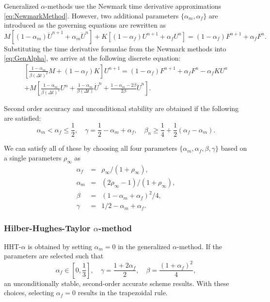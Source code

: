 \documentclass[12pt]{article}
\begin{document}
Generalized $\alpha$-methods \cite{Chung1993} use the Newmark time derivative approximations \eqref{eq:NewmarkMethod}.
However, two additional parameters $\{\alpha_m, \alpha_f\}$ are introduced as 
the governing equations are rewritten as
\begin{equation}
\label{eq:GenAlpha}
M \left[ (1-\alpha_m) \ddot{U}^{n+1} + \alpha_m \ddot{U}^n \right]
+ K \left[ (1-\alpha_f) {U}^{n+1} + \alpha_f {U}^n\right]
= (1-\alpha_f)F^{n+1} + \alpha_f F^n.
\end{equation}
%
Substituting the time derivative formulae from the Newmark methods into \eqref{eq:GenAlpha},
we arrive at the following discrete equation:
\begin{multline}
\left[  \frac{1-\alpha_m}{\beta (\Delta t)^2} M + (1-\alpha_f)K \right] U^{n+1} =
(1-\alpha_f)F^{n+1} + \alpha_f F^n - \alpha_f K U^n
\\
+ M\left[ \frac{1-\alpha_m}{\beta (\Delta t)^2} U^n 
+ \frac{1-\alpha_m}{\beta (\Delta t)} \dot{U}^n
+  \frac{1-\alpha_m - 2\beta}{2\beta} \ddot{U}^n
\right].
\end{multline}


Second order accuracy and unconditional stability are obtained
if the following are satisfied:
\begin{equation}
\alpha_m<\alpha_f\le \frac{1}{2}, 
\quad 
\gamma = \frac{1}{2} - \alpha_m + \alpha_f,
\quad
\beta_n \ge \frac{1}{4} + \frac{1}{2}(\alpha_f - \alpha_m).
\end{equation}

We can satisfy all of these by choosing all four parameters
$\{\alpha_m, \alpha_f, \beta, \gamma\}$ based on a single
parameters $\rho_\infty$ as
\begin{eqnarray}
\alpha_f &=& \rho_\infty/(1+\rho_\infty),
\\
\alpha_m &=& (2\rho_\infty-1)/(1+\rho_\infty),
\\
\beta &=& (1-\alpha_m+\alpha_f)^2/4,
\\
\gamma &=& 1/2 - \alpha_m + \alpha_f.
\end{eqnarray}

\subsubsection{Hilber-Hughes-Taylor $\alpha$-method}

HHT-$\alpha$ is obtained by setting $\alpha_m=0$ in the 
generalized $\alpha$-method.
If the parameters are selected such that \cite{Hughes2012}
\begin{equation}
\alpha_f \in \left[0,\frac{1}{3}\right], \quad \gamma = \frac{1+2\alpha_f}{2}, 
\quad \beta = \frac{(1+\alpha_f)^2}{4},
\end{equation}
an unconditionally stable, second-order accurate scheme results.
With these choices, selecting $\alpha_f=0$ results in the trapezoidal rule.
\end{document}
